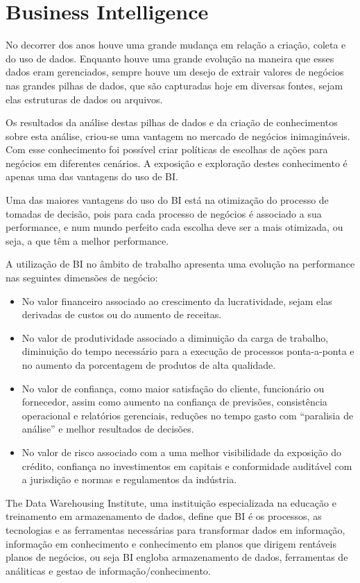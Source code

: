 \section{Business Intelligence}
No decorrer dos anos houve uma grande mudança em relação a criação, coleta e do uso de dados. Enquanto houve uma grande evolução na maneira que esses dados eram gerenciados, sempre houve um desejo de extrair valores de negócios nas grandes pilhas de dados, que são capturadas hoje em diversas fontes, sejam elas estruturas de dados ou arquivos.

Os resultados da análise destas pilhas de dados e da criação de conhecimentos sobre esta análise, criou-se uma vantagem no mercado de negócios inimagináveis. Com esse conhecimento foi possível criar políticas de escolhas de ações para negócios em diferentes cenários. A exposição e exploração destes conhecimento é apenas uma das vantagens do uso de BI.

Uma das maiores vantagens do uso do BI está na otimização do processo de tomadas de decisão, pois para cada processo de negócios é associado a sua performance, e num mundo perfeito cada escolha deve ser a mais otimizada, ou seja, a que têm a melhor performance\cite{business_intelligence}.

A utilização de BI no âmbito de trabalho apresenta uma evolução na performance nas seguintes dimensões de negócio:
\begin{itemize}
		\item No valor financeiro associado ao crescimento da lucratividade, sejam elas derivadas de custos ou do aumento de receitas.
		\item No valor de produtividade associado a diminuição da carga de trabalho, diminuição do tempo necessário para a execução de processos ponta-a-ponta e no aumento da porcentagem de produtos de alta qualidade.
		\item No valor de confiança, como maior satisfação do cliente, funcionário ou fornecedor, assim como aumento na confiança de previsões, consistência operacional e relatórios gerenciais, reduções no tempo gasto com “paralisia de análise” e melhor resultados de decisões.
		\item No valor de risco associado com a uma melhor visibilidade da exposição do crédito, confiança no investimentos em capitais e conformidade auditável com a jurisdição e normas e regulamentos da indústria.
\end{itemize}
The Data Warehousing Institute\cite{tdwi}, uma instituição especializada na educação e treinamento em armazenamento de dados, define que BI é os processos, as tecnologias e as ferramentas necessárias para transformar dados em informação, informação em conhecimento e conhecimento em planos que dirigem rentáveis planos de negócios, ou seja BI engloba armazenamento de dados, ferramentas de análiticas e gestao de informação/conhecimento. 

